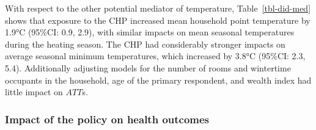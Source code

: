 \documentclass[
  letterpaper,
  DIV=11,
  numbers=noendperiod]{scrartcl}
\begin{document}
With respect to the other potential mediator of
temperature, Table~\ref{tbl-did-med} shows that exposure to the CHP
increased mean household point temperature by 1.9°C (95\%CI: 0.9, 2.9),
with similar impacts on mean seasonal temperatures during the heating
season. The CHP had considerably stronger impacts on average seasonal
minimum temperatures, which increased by 3.8°C (95\%CI: 2.3, 5.4).
Additionally adjusting models for the number of rooms and wintertime
occupants in the household, age of the primary respondent, and wealth
index had little impact on \(ATT\)s.

\subsubsection{Impact of the policy on health
outcomes}\label{impact-of-the-policy-on-health-outcomes}
\end{document}

